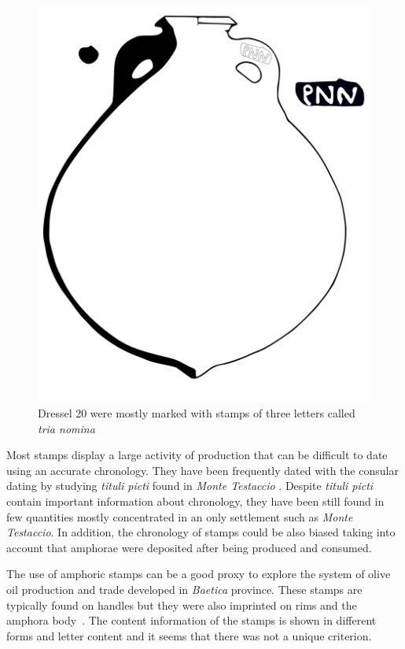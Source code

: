 \documentclass[review]{elsarticle}
\begin{document}
\begin{figure}[htp]
	\centering
\includegraphics[scale=0.5]{figs/dressel20}
\caption{Dressel 20 were mostly marked with stamps of three letters called \textit{tria nomina}}
\label{amphora}
\end{figure} 

Most stamps display a large activity of production that can be difficult to date using an accurate chronology. They have been frequently dated with the consular dating by studying \textit{tituli picti} found in \textit{Monte Testaccio} \citep{Testaccio1, berni_millet_epigrafianforica_2008}.
Despite \textit{tituli picti} contain important information about chronology, they have been still found in few quantities mostly concentrated in an only settlement such as \textit{Monte Testaccio}. In addition, the chronology of stamps could be also biased taking into account that amphorae were deposited after being produced and consumed.

The use of amphoric stamps can be a good proxy to explore the system of olive oil production and trade developed in \textit{Baetica} province. These stamps are typically found on handles but they were also imprinted on rims and the amphora body~\citep{millet_anforas_1998}. The content information of the stamps is shown in different forms and letter content and it seems that there was not a unique criterion.
\end{document}
